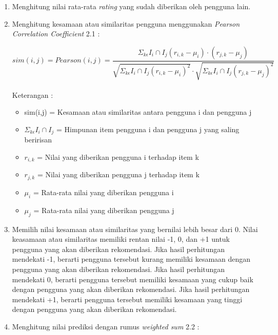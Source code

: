 \begin{enumerate}
	\item Menghitung nilai rata-rata \textit{rating} yang sudah diberikan oleh pengguna lain.
	
	\item Menghitung kesamaan atau similaritas pengguna menggunakan \textit{Pearson Correlation Coefficient} 2.1 :
	
	\begin{equation}
		sim(i,j) = Pearson(i,j) = \frac{\Sigma _{k\epsilon} I_{i} \cap I_{j} (r_{i,k}-\mu_{i}) \cdot (r_{j,k}-\mu_{j})}{\sqrt{\Sigma _{k\epsilon} I_{i} \cap I_{j} (r_{i,k}-\mu_{i})^2} \cdot \sqrt{\Sigma _{k\epsilon} I_{i} \cap I_{j} (r_{j,k}-\mu_{j})^2 }}
	\end{equation}\leavevmode \\
	Keterangan : 
	\begin{itemize}
		\item sim(i,j) = Kesamaan atau similaritas antara pengguna i dan pengguna j
		
		\item $\Sigma _{k\epsilon} I_{i} \cap I_{j}$ = Himpunan item pengguna i dan pengguna j yang saling beririsan
		
		\item $r_{i,k}$ = Nilai yang diberikan pengguna i terhadap item k
		
		\item $r_{j,k}$ = Nilai yang diberikan pengguna j terhadap item k
		
		\item $\mu_{i}$ = Rata-rata nilai yang diberikan pengguna i
		
		\item $\mu_{j}$ = Rata-rata nilai yang diberikan pengguna j
	\end{itemize}\leavevmode
	
	\item Memilih nilai kesamaan atau similaritas yang bernilai lebih besar dari 0. Nilai keasamaan atau similaritas memiliki rentan nilai -1, 0, dan +1 untuk pengguna yang akan diberikan rekomendasi. Jika hasil perhitungan mendekati -1, berarti pengguna tersebut kurang memiliki kesamaan dengan pengguna yang akan diberikan rekomendasi. Jika hasil perhitungan mendekati 0, berarti pengguna tersebut memiliki kesamaan yang cukup baik dengan pengguna yang akan diberikan rekomendasi. Jika hasil perhitungan mendekati +1, berarti pengguna tersebut memiliki kesamaan yang tinggi dengan pengguna yang akan diberikan rekomendasi.
	\item Menghitung nilai prediksi dengan rumus \textit{weighted sum} 2.2 :
	

\end{enumerate}
